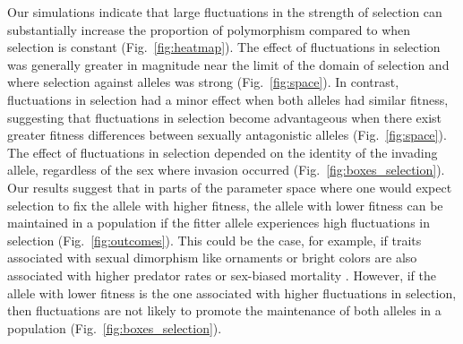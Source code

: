 \documentclass[12pt]{article}
\begin{document}
Our simulations indicate that large fluctuations in the strength of selection can substantially increase the proportion of polymorphism compared to when selection is constant (Fig.~\ref{fig:heatmap}). The effect of fluctuations in selection was generally greater in magnitude near the limit of the domain of selection and where selection against alleles was strong (Fig.~\ref{fig:space}). In contrast, fluctuations in selection had a minor effect when both alleles had similar fitness, suggesting that fluctuations in selection become advantageous when there exist greater fitness differences between sexually antagonistic alleles (Fig.~\ref{fig:space}). The effect of fluctuations in selection depended on the identity of the invading allele, regardless of the sex where invasion occurred (Fig.~\ref{fig:boxes_selection}). Our results suggest that in parts of the parameter space where one would expect selection to fix the allele with higher fitness, the allele with lower fitness can be maintained in a population if the fitter allele experiences high fluctuations in selection (Fig.~\ref{fig:outcomes}). This could be the case, for example, if traits associated with sexual dimorphism like ornaments or bright colors are also associated with higher predator rates \citep{bildstein1989consequences,gotmark1997natural} or sex-biased mortality \citep{promislow1992mortality}. However, if the allele with lower fitness is the one associated with higher fluctuations in selection, then fluctuations are not likely to promote the maintenance of both alleles in a population (Fig.~\ref{fig:boxes_selection}).

\end{document}
